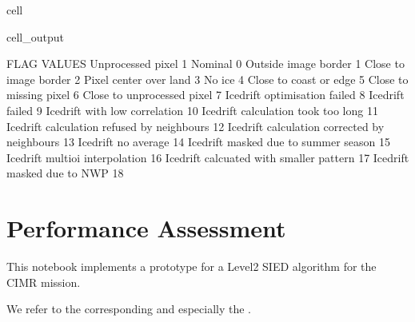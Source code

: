 \documentclass[letterpaper,10pt,english]{jupyterBook}
\begin{document}
\begin{sphinxuseclass}{cell}
\begin{sphinxVerbatimOutput}
\begin{sphinxuseclass}{cell_output}
\noindent{}

\begin{sphinxVerbatim}[commandchars=\\\{\}]
FLAG VALUES 
Unprocessed pixel                              \PYGZhy{}1
Nominal                                        0
Outside image border                           1
Close to image border                          2
Pixel center over land                         3
No ice                                         4
Close to coast or edge                         5
Close to missing pixel                         6
Close to unprocessed pixel                     7
Icedrift optimisation failed                   8
Icedrift failed                                9
Icedrift with low correlation                  10
Icedrift calculation took too long             11
Icedrift calculation refused by neighbours     12
Icedrift calculation corrected by neighbours   13
Icedrift no average                            14
Icedrift masked due to summer season           15
Icedrift multi\PYGZhy{}oi interpolation                16
Icedrift calcuated with smaller pattern        17
Icedrift masked due to NWP                     18
\end{sphinxVerbatim}

\noindent{}

\end{sphinxuseclass}\end{sphinxVerbatimOutput}

\end{sphinxuseclass}
\sphinxstepscope


\chapter{Performance Assessment}
\label{\detokenize{CIMR_L2_Sea_Ice_Drift_performanceAssessment:performance-assessment}}\label{\detokenize{CIMR_L2_Sea_Ice_Drift_performanceAssessment::doc}}
\sphinxAtStartPar
This notebook implements a prototype for a Level\sphinxhyphen{}2 SIED algorithm for the CIMR mission.

\sphinxAtStartPar
We refer to the corresponding  and especially the .
\end{document}
